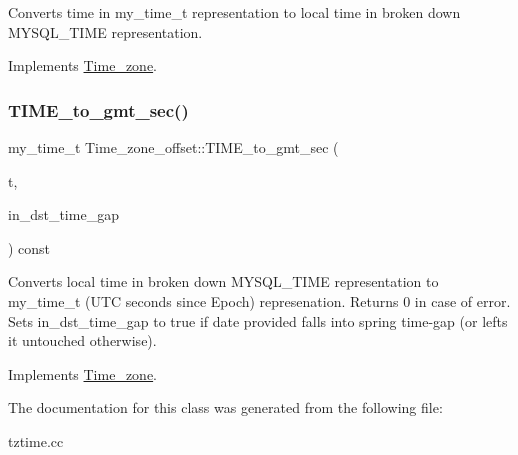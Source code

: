 Converts time in my\+\_\+time\+\_\+t representation to local time in broken down M\+Y\+S\+Q\+L\+\_\+\+T\+I\+ME representation. 

Implements \mbox{\hyperlink{classTime__zone_a7a15d4406de10928f8e39eb3549770a4}{Time\+\_\+zone}}.

\mbox{\label{classTime__zone__offset_ac37e335674d53e44a91772e755eac709}} 
\subsubsection{\texorpdfstring{T\+I\+M\+E\+\_\+to\+\_\+gmt\+\_\+sec()}{TIME\_to\_gmt\_sec()}}
{\footnotesize\ttfamily my\+\_\+time\+\_\+t Time\+\_\+zone\+\_\+offset\+::\+T\+I\+M\+E\+\_\+to\+\_\+gmt\+\_\+sec (\begin{DoxyParamCaption}\item[{const M\+Y\+S\+Q\+L\+\_\+\+T\+I\+ME $\ast$}]{t,  }\item[{my\+\_\+bool $\ast$}]{in\+\_\+dst\+\_\+time\+\_\+gap }\end{DoxyParamCaption}) const\hspace{0.3cm}{\ttfamily [virtual]}}

Converts local time in broken down M\+Y\+S\+Q\+L\+\_\+\+T\+I\+ME representation to my\+\_\+time\+\_\+t (U\+TC seconds since Epoch) represenation. Returns 0 in case of error. Sets in\+\_\+dst\+\_\+time\+\_\+gap to true if date provided falls into spring time-\/gap (or lefts it untouched otherwise). 

Implements \mbox{\hyperlink{classTime__zone_a980bb1d59fe04e899b116169f1b3166d}{Time\+\_\+zone}}.



The documentation for this class was generated from the following file\+:\begin{DoxyCompactItemize}
\item 
tztime.\+cc\end{DoxyCompactItemize}
